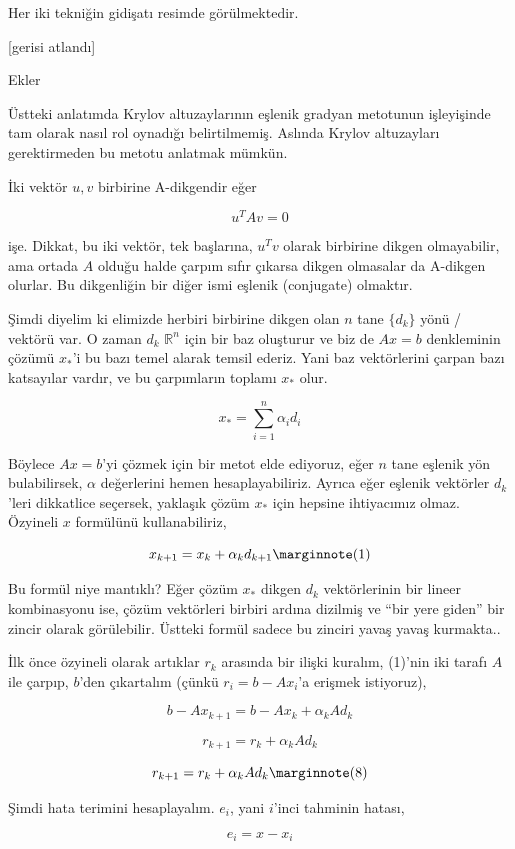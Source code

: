 \documentclass[12pt,fleqn]{article}\usepackage{../../common}
\begin{document}
Her iki tekniğin gidişatı resimde görülmektedir. 

[gerisi atlandı]

Ekler 

Üstteki anlatımda Krylov altuzaylarının eşlenik gradyan metotunun
işleyişinde tam olarak nasıl rol oynadığı belirtilmemiş. Aslında Krylov
altuzayları gerektirmeden bu metotu anlatmak mümkün. 

İki vektör $u,v$ birbirine A-dikgendir eğer

$$ u^TAv = 0 $$ 

işe. Dikkat, bu iki vektör, tek başlarına, $u^Tv$ olarak birbirine
dikgen olmayabilir, ama ortada $A$ olduğu halde çarpım sıfır çıkarsa
dikgen olmasalar da A-dikgen olurlar. Bu dikgenliğin bir diğer
ismi eşlenik (conjugate) olmaktır.

Şimdi diyelim ki elimizde herbiri birbirine dikgen olan $n$ tane
$\{d_k\}$ yönü / vektörü var. O zaman $d_k$ $\mathbb{R}^n$ için bir baz
oluşturur ve biz de $Ax = b$ denkleminin çözümü $x_*$'i bu bazı temel
alarak temsil ederiz. Yani baz vektörlerini çarpan bazı katsayılar vardır,
ve bu çarpımların toplamı $x_*$ olur. 

$$ x_* = \sum_{ i=1}^{n} \alpha_i d_i $$

Böylece $Ax = b$'yi çözmek için bir metot elde ediyoruz, eğer $n$ tane
eşlenik yön bulabilirsek, $\alpha$ değerlerini hemen hesaplayabiliriz.
Ayrıca eğer eşlenik vektörler $d_k$'leri dikkatlice seçersek, yaklaşık çözüm $x_*$
için hepsine ihtiyacımız olmaz. Özyineli $x$ formülünü kullanabiliriz,

$$
x_{k+1} = x_k + \alpha_k d_{k+1} 
\mlabel{1}
$$

Bu formül niye mantıklı? Eğer çözüm $x_*$ dikgen $d_k$ vektörlerinin bir
lineer kombinasyonu ise, çözüm vektörleri birbiri ardına dizilmiş ve ``bir
yere giden'' bir zincir olarak görülebilir. Üstteki formül sadece bu
zinciri yavaş yavaş kurmakta..

İlk önce özyineli olarak artıklar $r_k$ arasında bir ilişki kuralım,
(1)'nin iki tarafı $A$ ile çarpıp, $b$'den çıkartalım (çünkü
$r_i = b - Ax_i$'a erişmek istiyoruz),

$$b - A x_{k+1} = b - A x_k  + \alpha_k A d_{k} $$

$$r_{k+1} = r_k + \alpha_k A d_{k} $$

$$
r_{k+1} = r_k + \alpha_k A d_{k} 
\mlabel{8}
$$

Şimdi hata terimini hesaplayalım. $e_i$, yani $i$'inci tahminin hatası, 

$$ e_i = x - x_i  $$
\end{document}
